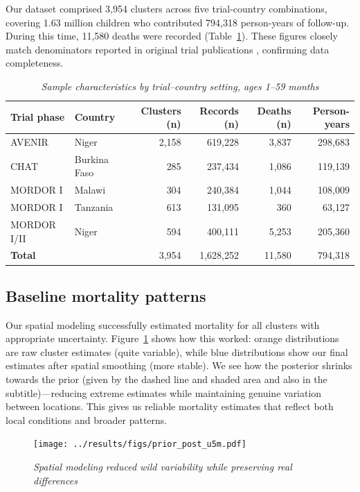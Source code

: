 \documentclass[11pt]{article}\usepackage[]{graphicx}\usepackage[]{xcolor}
\begin{document}
Our dataset comprised 3,954 clusters across five trial-country combinations, covering 1.63 million children who contributed 794,318 person-years of follow-up. During this time, 11,580 deaths were recorded (Table~\ref{tab:analysis-sample}). These figures closely match denominators reported in original trial publications \citep{keenan2018nejm, oldenburg2024jama, o2024azithromycin}, confirming data completeness.

\begin{table}[!h]
\centering
\caption{\emph{Sample characteristics by trial--country setting, ages 1--59 months}}
\label{tab:analysis-sample}
\begin{tabular}{l l r r r r}
\toprule
Trial phase & Country & Clusters (n) & Records (n) & Deaths (n) & Person-years \\
\midrule
AVENIR      & Niger        & 2,158 & 619,228 & 3,837 & 298,683 \\
CHAT        & Burkina Faso &   285 & 237,434 & 1,086 & 119,139 \\
MORDOR I    & Malawi       &   304 & 240,384 & 1,044 & 108,009 \\
MORDOR I    & Tanzania     &   613 & 131,095 &   360 &  63,127 \\
MORDOR I/II & Niger        &   594 & 400,111 & 5,253 & 205,360 \\
\midrule
\textbf{Total} &            & 3,954 & 1,628,252 & 11,580 & 794,318 \\
\bottomrule
\end{tabular}
\end{table}

\subsection{Baseline mortality patterns}

Our spatial modeling successfully estimated mortality for all clusters with appropriate uncertainty. Figure~\ref{fig:prior-post-u5m} shows how this worked: orange distributions are raw cluster estimates (quite variable), while blue distributions show our final estimates after spatial smoothing (more stable). We see how the posterior shrinks towards the prior (given by the dashed line and shaded area and also in the subtitle)---reducing extreme estimates while maintaining genuine variation between locations. This gives us reliable mortality estimates that reflect both local conditions and broader patterns.

\begin{figure}[!h]
\centering
\texttt{[image: ../results/figs/prior\_post\_u5m.pdf]}
\caption{\emph{Spatial modeling reduced wild variability while preserving real differences}}
\label{fig:prior-post-u5m}
\end{figure}
\end{document}
